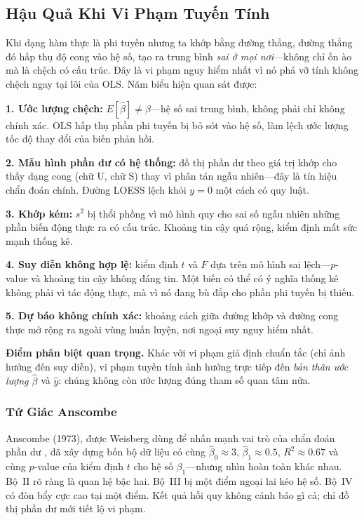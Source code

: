\subsection{Hậu Quả Khi Vi Phạm Tuyến Tính}

Khi dạng hàm thực là phi tuyến nhưng ta khớp bằng đường thẳng, đường thẳng đó hấp thụ độ cong vào hệ số, tạo ra trung bình \textit{sai ở mọi nơi}---không chỉ ồn ào mà là chệch có cấu trúc. Đây là vi phạm nguy hiểm nhất vì nó phá vỡ tính không chệch ngay tại lõi của OLS. Năm biểu hiện quan sát được:

\textbf{1. Ước lượng chệch:} $E[\hat{\beta}] \neq \beta$---hệ số sai trung bình, không phải chỉ không chính xác. OLS hấp thụ phần phi tuyến bị bỏ sót vào hệ số, làm lệch ước lượng tốc độ thay đổi của biến phản hồi.

\textbf{2. Mẫu hình phần dư có hệ thống:} đồ thị phần dư theo giá trị khớp cho thấy dạng cong (chữ U, chữ S) thay vì phân tán ngẫu nhiên---đây là tín hiệu chẩn đoán chính. Đường LOESS lệch khỏi $y = 0$ một cách có quy luật.

\textbf{3. Khớp kém:} $s^2$ bị thổi phồng vì mô hình quy cho sai số ngẫu nhiên những phần biến động thực ra có cấu trúc. Khoảng tin cậy quá rộng, kiểm định mất sức mạnh thống kê.

\textbf{4. Suy diễn không hợp lệ:} kiểm định $t$ và $F$ dựa trên mô hình sai lệch---$p$-value và khoảng tin cậy không đáng tin. Một biến có thể có ý nghĩa thống kê không phải vì tác động thực, mà vì nó đang bù đắp cho phần phi tuyến bị thiếu.

\textbf{5. Dự báo không chính xác:} khoảng cách giữa đường khớp và đường cong thực mở rộng ra ngoài vùng huấn luyện, nơi ngoại suy nguy hiểm nhất.

\textbf{Điểm phân biệt quan trọng.} Khác với vi phạm giả định chuẩn tắc (chỉ ảnh hưởng đến suy diễn), vi phạm tuyến tính ảnh hưởng trực tiếp đến \textit{bản thân ước lượng $\hat{\beta}$} và $\hat{y}$: chúng không còn ước lượng đúng tham số quan tâm nữa.

\subsubsection{Tứ Giác Anscombe}

Anscombe (1973), được Weisberg dùng để nhấn mạnh vai trò của chẩn đoán phần dư \cite[Sec.~2.4, p.~27]{weisberg2014applied}, đã xây dựng bốn bộ dữ liệu có cùng $\hat{\beta}_0 \approx 3$, $\hat{\beta}_1 \approx 0.5$, $R^2 \approx 0.67$ và cùng $p$-value của kiểm định $t$ cho hệ số $\beta_1$---nhưng nhìn hoàn toàn khác nhau. Bộ~II rõ ràng là quan hệ bậc hai. Bộ~III bị một điểm ngoại lai kéo hệ số. Bộ~IV có đòn bẩy cực cao tại một điểm. Kết quả hồi quy không cảnh báo gì cả; chỉ đồ thị phần dư mới tiết lộ vi phạm.

